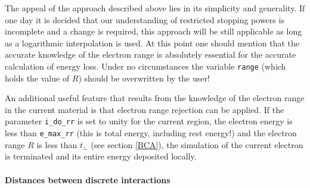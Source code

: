 The appeal of the approach described above lies in its simplicity 
and generality. If one day it is decided that our understanding 
of restricted stopping powers is incomplete and a change 
is required, this approach will be still applicable as long 
as a logarithmic interpolation is used. At this point one 
should mention that the accurate knowledge of the electron range 
is absolutely essential for the accurate calculation of 
energy loss. Under no circumstances the variable 
{\tt range} (which holds the value of $R$) 
should be overwritten by the user!

An additional useful feature that results from the knowledge 
of the electron range in the current material is that 
electron range rejection can be applied. If the parameter 
{\tt i\_do\_rr} is set to unity for the current region, 
the electron energy is less than {\tt e\_max\_rr} (this 
is total energy, including rest energy!) and the electron 
range $R$ is less than $t_\perp$ (see section \ref{BCA}), 
the simulation of the current electron is terminated and its entire energy 
deposited locally. 

\paragraph{Distances between discrete interactions} \hfill
\label{eloss_evaluation}

